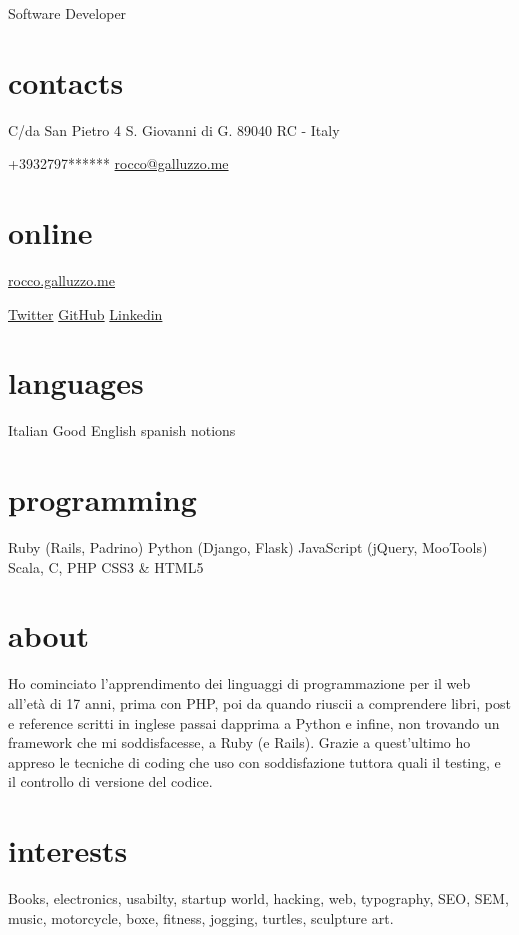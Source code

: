 \documentclass[print]{cv}
\begin{document}
       {Software Developer}

\begin{aside}%
\section{contacts}
    C/da San Pietro 4
    S. Giovanni di G. 
89040 RC - Italy\par\smallskip%
+3932797******
	\href{mailto:rocco@galluzzo.me}{rocco@galluzzo.me}
	\section{online}
	\href{http://rocco.galluzzo.me}{rocco.galluzzo.me}
         \par\smallskip%
	\href{http://twitter.com/byterussian}{Twitter}
           \href{https://github.com/byterussian}{GitHub}
           \href{http://www.linkedin.com/in/roccogalluzzo}{Linkedin}
  \section{languages}
    Italian
    Good English 
    spanish notions
  \section{programming}
    Ruby
    (Rails, Padrino)
    Python
    (Django, Flask)
    JavaScript
    (jQuery, MooTools)
    Scala, C, PHP
    CSS3 \& HTML5
\end{aside}

\section{about}
Ho cominciato l'apprendimento dei linguaggi di programmazione per il web all'età di 17 anni, 
prima con PHP, poi da quando riuscii a comprendere libri, post e reference scritti in inglese
 passai dapprima a Python e infine, non trovando un framework che mi soddisfacesse, a Ruby (e Rails). 
 Grazie a quest'ultimo ho appreso le tecniche di coding che uso con soddisfazione tuttora
 quali il testing, e il controllo di versione del codice.

\section{interests}

Books, electronics, usabilty, startup world, hacking, web, typography, SEO, SEM, music, motorcycle, boxe, fitness, jogging,
turtles, sculpture art.
\end{document}
